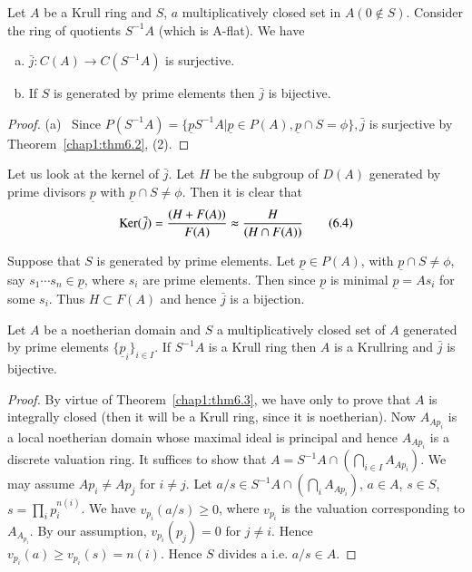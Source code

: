  \begin{theorem}[Nagata]\label{chap1:thm6.3} %
Let $A$ be a Krull ring and $S$, $a$ multiplicatively
      closed set in $A (0 \notin S)$. Consider the ring of quotients
      $S^{-1}A $ (which is A-flat). We have 
\begin{enumerate}[(a)]
\item  $\bar{j} : C(A) \rightarrow C(S^{-1} A)$ is surjective.

\item If $S$ is generated by prime elements then $\bar{j}$ is bijective.
\end{enumerate}
\end{theorem}  
  
\begin{proof}
(a)~ Since $P(S^{-1} A) = \big\{\underline{p}  S^{-1} A \big| 
    \underline{p} \in P (A), \underline{p} \cap S  = \phi \big\},
    \bar{j}$ is surjective by Theorem~\ref{chap1:thm6.2}, (2). 
\end{proof}  
  
  Let us look at the kernel of $\bar{j}$. Let $H$ be the subgroup of
  $D(A)$ generated by prime divisors $\underline{p}$ with
  $\underline{p} \cap S \neq \phi$. Then it is clear that 
  \begin{equation*} 
\operatorname{Ker} (\bar{j}) = \frac{(H + F(A))}{F(A)} \thickapprox \frac{H}{(H \cap
  F(A))} \tag{6.4}\label{c1:eq6.4} 
  \end{equation*}  

  \noindent
  Suppose that $S$ is generated by prime elements. Let $\underline{p}
  \in P(A)$, with $\underline{p} \cap S \neq \phi$, say $s_1 \cdots
  s_n \in \underline{p}$, where $s_i$ are prime elements. Then since
  $\underline{p}$ is minimal $\underline{p} = As_i $ for some
  $s_i$. Thus $H \subset F(A)$ and hence $\bar{j}$ is a bijection. 
  
\setcounter{dashthm}{2}
\begin{dashthm}[Nagata]\label{chap1:thm6.3'}%
Let $A$ be a noetherian domain and $S$ a
      multiplicatively closed set of $A$ generated by prime
      elements $\big \{\underline{p}_i \big\}_{i \in I}$. If $S^{-1}
      A$ is a Krull ring then $A$ is a Krull\pageoriginale ring and
      $\bar{j}$ is 
      bijective.
\end{dashthm}
  
\begin{proof}
By virtue of Theorem~\ref{chap1:thm6.3}, we have only to prove that
$A$ is 
integrally closed (then it will be a Krull ring, since it is
noetherian). Now $A_{Ap_i}$ is a local noetherian domain whose
maximal ideal is principal and hence $A_{Ap_i}$ is a discrete
valuation ring. It suffices to show that $A = S^{-1} A \cap
(\bigcap\limits_{i \in I}A_{Ap_i})$. We may assume $Ap_{i}
\neq Ap_j$ for $i \neq j$. Let $a/s \in S^{-1} A \cap
(\bigcap\limits_{i} A_{Ap_{i}})$, $a \in A$, $s \in S$, $s = \prod_i
p_i^{n (i)}$. We have $v_{p_i} (a/s) \ge 0$, where $v_{p_i}$ is the
valuation corresponding to $A_{A_{p_{i}}}$. By our assumption,
$v_{p_i}(p_j) = 0$ for $j \neq i$. Hence $v_{p_i} (a) \ge v_{p_i}(s) =
n(i)$. Hence $S$ divides a i.e. $a/s \in A$. 
  \end{proof}  
  
